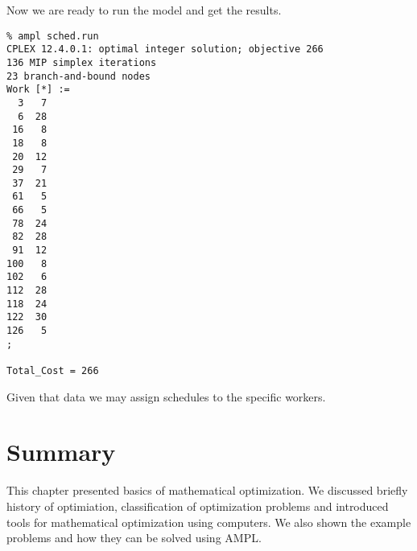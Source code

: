 Now we are ready to run the model and get the results.

\begin{lstlisting}
% ampl sched.run
CPLEX 12.4.0.1: optimal integer solution; objective 266
136 MIP simplex iterations
23 branch-and-bound nodes
Work [*] :=
  3   7
  6  28
 16   8
 18   8
 20  12
 29   7
 37  21
 61   5
 66   5
 78  24
 82  28
 91  12
100   8
102   6
112  28
118  24
122  30
126   5
;

Total_Cost = 266
\end{lstlisting}

Given that data we may assign schedules to the specific workers.

\section{Summary}

This chapter presented basics of mathematical optimization. We discussed briefly history of optimiation, classification of optimization problems and introduced tools for mathematical optimization using computers. We also shown the example problems and how they can be solved using AMPL.
